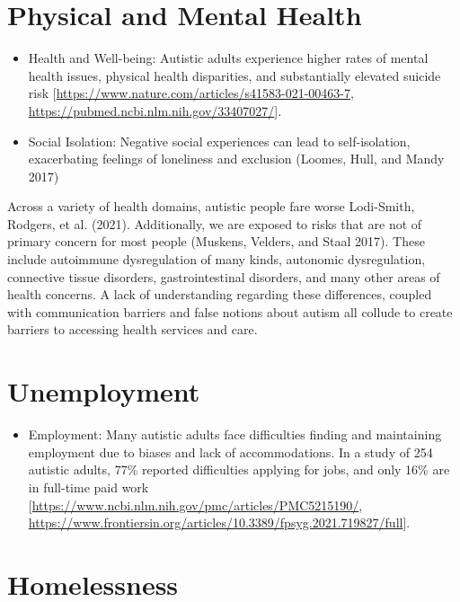 \documentclass[
  letterpaper,
  DIV=11,
  numbers=noendperiod]{scrreprt}
\providecommand{\tightlist}{%
  \setlength{\itemsep}{0pt}\setlength{\parskip}{0pt}}\usepackage{longtable,booktabs,array}
\begin{document}
\hypertarget{sec-physical_mental_health}{%
\section{Physical and Mental Health}\label{sec-physical_mental_health}}

\begin{itemize}
\tightlist
\item
  Health and Well-being: Autistic adults experience higher rates of
  mental health issues, physical health disparities, and substantially
  elevated suicide risk
  {[}\url{https://www.nature.com/articles/s41583-021-00463-7},
  \url{https://pubmed.ncbi.nlm.nih.gov/33407027/}{]}.
\item
  Social Isolation: Negative social experiences can lead to
  self-isolation, exacerbating feelings of loneliness and exclusion
  (Loomes, Hull, and Mandy 2017)
\end{itemize}

Across a variety of health domains, autistic people fare worse
Lodi-Smith, Rodgers, et al. (2021). Additionally, we are exposed to
risks that are not of primary concern for most people (Muskens, Velders,
and Staal 2017). These include autoimmune dysregulation of many kinds,
autonomic dysregulation, connective tissue disorders, gastrointestinal
disorders, and many other areas of health concerns. A lack of
understanding regarding these differences, coupled with communication
barriers and false notions about autism all collude to create barriers
to accessing health services and care.

\hypertarget{sec-unemployment}{%
\section{Unemployment}\label{sec-unemployment}}

\begin{itemize}
\tightlist
\item
  Employment: Many autistic adults face difficulties finding and
  maintaining employment due to biases and lack of accommodations. In a
  study of 254 autistic adults, 77\% reported difficulties applying for
  jobs, and only 16\% are in full-time paid work
  {[}\url{https://www.ncbi.nlm.nih.gov/pmc/articles/PMC5215190/},
  \url{https://www.frontiersin.org/articles/10.3389/fpsyg.2021.719827/full}{]}.
\end{itemize}

\hypertarget{sec-homelessness}{%
\section{Homelessness}\label{sec-homelessness}}
\end{document}
